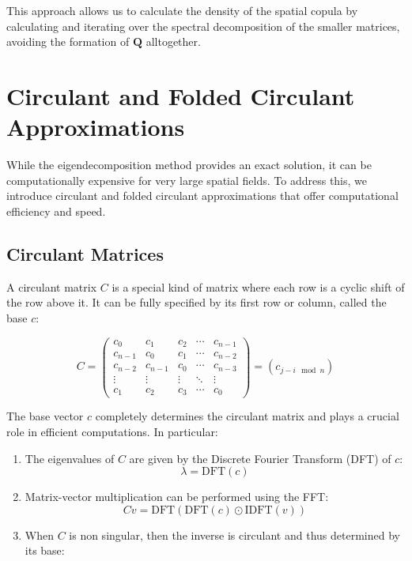 \documentclass[
  12pt]{article}
\begin{document}
This approach allows us to calculate the density of the spatial copula
by calculating and iterating over the spectral decomposition of the
smaller matrices, avoiding the formation of \(\mathbf Q\) alltogether.

\section{Circulant and Folded Circulant
Approximations}\label{circulant-and-folded-circulant-approximations}

While the eigendecomposition method provides an exact solution, it can
be computationally expensive for very large spatial fields. To address
this, we introduce circulant and folded circulant approximations that
offer computational efficiency and speed.

\subsection{Circulant Matrices}\label{circulant-matrices}

A circulant matrix \(C\) is a special kind of matrix where each row is a
cyclic shift of the row above it. It can be fully specified by its first
row or column, called the base \(c\):

\[
C = \begin{pmatrix}
c_0 & c_1 & c_2 & \cdots & c_{n-1} \\
c_{n-1} & c_0 & c_1 & \cdots & c_{n-2} \\
c_{n-2} & c_{n-1} & c_0 & \cdots & c_{n-3} \\
\vdots & \vdots & \vdots & \ddots & \vdots \\
c_1 & c_2 & c_3 & \cdots & c_0
\end{pmatrix} = (c_{j-i \mod n})
\]

The base vector \(c\) completely determines the circulant matrix and
plays a crucial role in efficient computations. In particular:

\begin{enumerate}
\def\labelenumi{\arabic{enumi}.}
\item
  The eigenvalues of \(C\) are given by the Discrete Fourier Transform
  (DFT) of \(c\): \[
  \lambda = \text{DFT}(c)
  \]
\item
  Matrix-vector multiplication can be performed using the FFT: \[
  Cv = \text{DFT}(\text{DFT}(c) \odot \text{IDFT}(v))
  \]
\item
  When \(C\) is non singular, then the inverse is circulant and thus
  determined by its base:
\end{enumerate}
\end{document}
